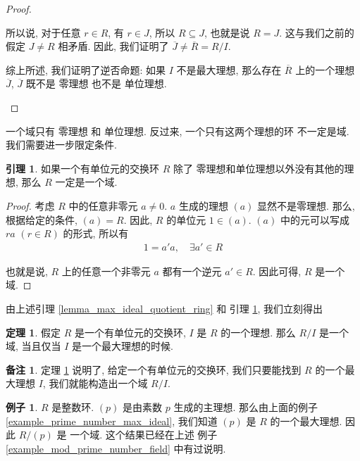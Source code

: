 \documentclass[utf8]{ctexbook}
\theoremstyle{definition}
\newtheorem{prototheorem}{定理}[section]
\newenvironment{theorem}
   {\colorlet{shadecolor}{pink!30}\begin{shaded}\begin{prototheorem}}
   {\end{prototheorem}\end{shaded}}
\newtheorem{memo}{备注}[section]
\newtheorem{example}{例子}[section]
\newtheorem{lemma}{引理}[section]
\begin{document}
\begin{proof}
\begin{itemize}
{\begin{enumerate}
{所以说, 对于任意 $r \in R$, 有 $r \in J$, 所以 $R \subseteq J$, 也就是说 $R = J$. 这与我们之前的假定 $J \neq R$ 相矛盾. 因此, 我们证明了 $\overline{J} \neq \overline{R} = R/I$.}
\end{enumerate}

综上所述, 我们证明了逆否命题: 如果 $I$ 不是最大理想, 那么存在 $\overline{R}$ 上的一个理想 $\overline{J}$, $\overline{J}$ 既不是 零理想  也不是 单位理想.
}
\end{itemize}
\end{proof}

一个域只有 零理想 和 单位理想. 反过来, 一个只有这两个理想的环 不一定是域. 我们需要进一步限定条件.

\begin{lemma}\label{lemma_max_ideal_to_field}
如果一个有单位元的交换环 $R$ 除了 零理想和单位理想以外没有其他的理想, 那么 $R$ 一定是一个域.
\end{lemma}

\begin{proof}
考虑 $R$ 中的任意非零元 $a \neq 0$. $a$ 生成的理想 $(a)$ 显然不是零理想. 那么, 根据给定的条件, $(a) = R$. 因此, $R$ 的单位元 $1 \in (a)$. $(a)$ 中的元可以写成 $ra $ $(r \in R)$ 的形式, 所以有
\begin{align*}
1 = a' a, \quad \exists a' \in R
\end{align*}

也就是说, $R$ 上的任意一个非零元 $a$ 都有一个逆元 $a' \in R$. 因此可得, $R$ 是一个域.
\end{proof}

由上述引理 \ref{lemma_max_ideal_quotient_ring} 和 引理 \ref{lemma_max_ideal_to_field}, 我们立刻得出


\begin{theorem}\label{theorem_max_ideal_to_field}
假定 $R$ 是一个有单位元的交换环, $I$ 是 $R$ 的一个理想. 那么 $R/I$ 是一个域, 当且仅当 $I$ 是一个最大理想的时候.
\end{theorem}

\begin{memo}
定理 \ref{theorem_max_ideal_to_field} 说明了, 给定一个有单位元的交换环, 我们只要能找到 $R$ 的一个最大理想 $I$, 我们就能构造出一个域 $R/I$.
\end{memo}

\begin{example}
$R$ 是整数环. $(p)$ 是由素数 $p$ 生成的主理想. 那么由上面的例子 \ref{example_prime_number_max_ideal}, 我们知道 $(p)$ 是 $R$ 的一个最大理想. 因此 $R/(p)$ 是 一个域. 这个结果已经在上述 例子 \ref{example_mod_prime_number_field} 中有过说明.
\end{example}
\end{document}
